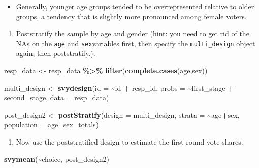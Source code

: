 \documentclass[
]{article}
\newenvironment{Shaded}{\begin{snugshade}}{\end{snugshade}}
\newcommand{\AttributeTok}[1]{\textcolor[rgb]{0.13,0.29,0.53}{#1}}
\newcommand{\FunctionTok}[1]{\textcolor[rgb]{0.13,0.29,0.53}{\textbf{#1}}}
\newcommand{\NormalTok}[1]{#1}
\newcommand{\OtherTok}[1]{\textcolor[rgb]{0.56,0.35,0.01}{#1}}
\newcommand{\SpecialCharTok}[1]{\textcolor[rgb]{0.81,0.36,0.00}{\textbf{#1}}}
\providecommand{\tightlist}{%
  \setlength{\itemsep}{0pt}\setlength{\parskip}{0pt}}
\begin{document}
\begin{itemize}
\tightlist
\item
  Generally, younger age groups tended to be overrepresented relative to
  older groups, a tendency that is slightly more pronounced among female
  voters.
\end{itemize}

\begin{enumerate}
\def\labelenumi{\arabic{enumi}.}
\setcounter{enumi}{2}
\tightlist
\item
  Poststratify the sample by age and gender (hint: you need to get rid
  of the NAs on the \texttt{age} and \texttt{sex}variables first, then
  specify the \texttt{multi\_design} object again, then poststratify.).
\end{enumerate}

\begin{Shaded}
\begin{Highlighting}[]
\NormalTok{resp\_data }\OtherTok{\textless{}{-}}\NormalTok{ resp\_data }\SpecialCharTok{\%\textgreater{}\%}
  \FunctionTok{filter}\NormalTok{(}\FunctionTok{complete.cases}\NormalTok{(age,sex))}

\NormalTok{multi\_design }\OtherTok{\textless{}{-}} \FunctionTok{svydesign}\NormalTok{(}\AttributeTok{id =} \SpecialCharTok{\textasciitilde{}}\NormalTok{id }\SpecialCharTok{+}\NormalTok{ resp\_id, }\AttributeTok{probs =} \SpecialCharTok{\textasciitilde{}}\NormalTok{first\_stage }\SpecialCharTok{+}\NormalTok{ second\_stage, }\AttributeTok{data =}\NormalTok{ resp\_data)}

\NormalTok{post\_design2 }\OtherTok{\textless{}{-}} \FunctionTok{postStratify}\NormalTok{(}\AttributeTok{design =}\NormalTok{ multi\_design, }\AttributeTok{strata =} \SpecialCharTok{\textasciitilde{}}\NormalTok{age}\SpecialCharTok{+}\NormalTok{sex, }\AttributeTok{population =}\NormalTok{ age\_sex\_totals)  }
\end{Highlighting}
\end{Shaded}

\begin{enumerate}
\def\labelenumi{\arabic{enumi}.}
\setcounter{enumi}{3}
\tightlist
\item
  Now use the poststratified design to estimate the first-round vote
  shares.
\end{enumerate}

\begin{Shaded}
\begin{Highlighting}[]
\FunctionTok{svymean}\NormalTok{(}\SpecialCharTok{\textasciitilde{}}\NormalTok{choice, post\_design2)}
\end{Highlighting}
\end{Shaded}
\end{document}
